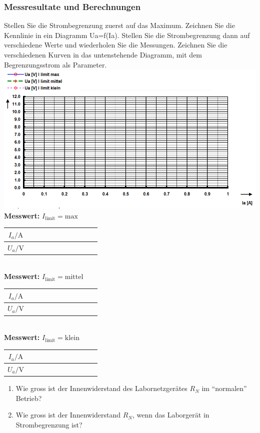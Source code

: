 \subsubsection{Messresultate und Berechnungen}
Stellen Sie die Strombegrenzung zuerst auf das Maximum. Zeichnen Sie die Kennlinie in ein Diagramm Ua=f(Ia). Stellen Sie die Strombegrenzung dann auf verschiedene Werte und wiederholen Sie die Messungen. Zeichnen Sie die verschiedenen Kurven in das untenstehende Diagramm, mit dem Begrenzungsstrom als Parameter.\\
\includegraphics[scale=0.5]{../img/III/IIIf}
\\
\textbf{Messwert:} $I_{\text{limit}}=\text{max}$\\
\begin{tabular}{|c|c|c|c|c|c|c|c|c|c|c|}\hline
$I_a/\text{A}$&&&&&&&&&&\\\hline
$U_a/\text{V}$&&&&&&&&&&\\\hline
\end{tabular}
\\
\textbf{Messwert:} $I_{\text{limit}}=\text{mittel}$\\
\begin{tabular}{|c|c|c|c|c|c|c|c|c|c|c|}\hline
$I_a/\text{A}$&&&&&&&&&&\\\hline
$U_a/\text{V}$&&&&&&&&&&\\\hline
\end{tabular}
\\
\textbf{Messwert:} $I_{\text{limit}}=\text{klein}$\\
\begin{tabular}{|c|c|c|c|c|c|c|c|c|c|c|}\hline
$I_a/\text{A}$&&&&&&&&&&\\\hline
$U_a/\text{V}$&&&&&&&&&&\\\hline
\end{tabular}
\begin{enumerate}[$a)$]
\item Wie gross ist der Innenwiderstand des Labornetzgerätes $R_N$ im ``normalen'' Betrieb?
\item Wie gross ist der Innenwiderstand $R_N$, wenn das Laborgerät in Strombegrenzung ist?
\end{enumerate}
